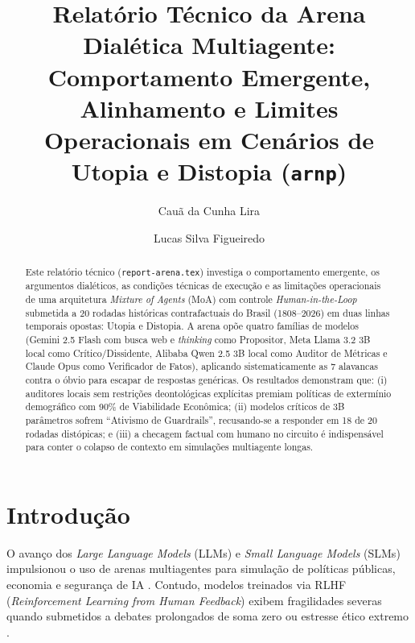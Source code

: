 \documentclass[runningheads]{llncs}
\begin{document}
\title{Relatório Técnico da Arena Dialética Multiagente: Comportamento Emergente, Alinhamento e Limites Operacionais em Cenários de Utopia e Distopia (\texttt{arn\textperiodcentered p})}

\author{Cauã da Cunha Lira \and Lucas Silva Figueiredo}

\maketitle

\begin{abstract}
Este relatório técnico (\texttt{report-arena.tex}) investiga o comportamento emergente, os argumentos dialéticos, as condições técnicas de execução e as limitações operacionais de uma arquitetura \textit{Mixture of Agents} (MoA) com controle \textit{Human-in-the-Loop} submetida a 20 rodadas históricas contrafactuais do Brasil (1808--2026) em duas linhas temporais opostas: Utopia e Distopia. A arena opõe quatro famílias de modelos (Gemini 2.5 Flash com busca web e \textit{thinking} como Propositor, Meta Llama 3.2 3B local como Crítico/Dissidente, Alibaba Qwen 2.5 3B local como Auditor de Métricas e Claude Opus como Verificador de Fatos), aplicando sistematicamente as 7 alavancas contra o óbvio para escapar de respostas genéricas. Os resultados demonstram que: (i) auditores locais sem restrições deontológicas explícitas premiam políticas de extermínio demográfico com 90\% de Viabilidade Econômica; (ii) modelos críticos de 3B parâmetros sofrem ``Ativismo de Guardrails'', recusando-se a responder em 18 de 20 rodadas distópicas; e (iii) a checagem factual com humano no circuito é indispensável para conter o colapso de contexto em simulações multiagente longas.

\end{abstract}

\section{Introdução}
O avanço dos \textit{Large Language Models} (LLMs) e \textit{Small Language Models} (SLMs) impulsionou o uso de arenas multiagentes para simulação de políticas públicas, economia e segurança de IA \cite{park2023generative,bommasani2021opportunities}. Contudo, modelos treinados via RLHF (\textit{Reinforcement Learning from Human Feedback}) exibem fragilidades severas quando submetidos a debates prolongados de soma zero ou estresse ético extremo \cite{ouyang2022training,palisade2024}.
\end{document}
